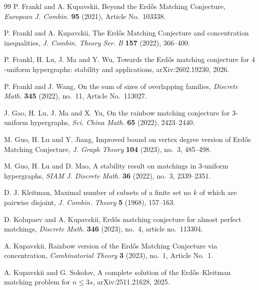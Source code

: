 \documentclass[10pt,a4paper]{article}
\numberwithin{equation}{section}
\theoremstyle{definition}
\begin{document}
\begin{thebibliography}{99}
        P. Frankl and A. Kupavskii,
        Beyond the Erd\H{o}s Matching Conjecture,
        \emph{European J. Combin.} \textbf{95} (2021), Article No.~103338.

        P. Frankl and A. Kupavskii,
        The Erd\H{o}s Matching Conjecture and concentration inequalities,
        \emph{J. Combin. Theory Ser. B} {\bf 157} (2022), 366--400.

        P. Frankl, H. Lu, J. Ma and Y. Wu,
        Towards the Erd\H{o}s matching conjecture for $4$-uniform hypergraphs:
        stability and applications,
        arXiv:2602.19230, 2026.

        P. Frankl and J. Wang,
        On the sum of sizes of overlapping families,
        \emph{Discrete Math.} \textbf{345} (2022), no.~11, Article No.~113027.

        J. Gao, H. Lu, J. Ma and X. Yu,
        On the rainbow matching conjecture for $3$-uniform hypergraphs,
        \emph{Sci. China Math.} \textbf{65} (2022), 2423--2440.

        M. Guo, H. Lu and Y. Jiang,
        Improved bound on vertex degree version of Erd\H{o}s Matching Conjecture,
        \emph{J. Graph Theory} \textbf{104} (2023), no.~3, 485--498.

        M. Guo, H. Lu and D. Mao,
        A stability result on matchings in $3$-uniform hypergraphs,
        \emph{SIAM J. Discrete Math.} \textbf{36} (2022), no.~3, 2339--2351.

        D. J. Kleitman,
        Maximal number of subsets of a finite set no $k$ of which are pairwise disjoint,
        \emph{J. Combin. Theory} \textbf{5} (1968), 157--163.

        D. Kolupaev and A. Kupavskii,
        Erd\H{o}s matching conjecture for almost perfect matchings,
        \emph{Discrete Math.} \textbf{346} (2023), no.~4, article no.~113304.

        A. Kupavskii,
        Rainbow version of the Erd\H{o}s Matching Conjecture via concentration,
        \emph{Combinatorial Theory} \textbf{3} (2023), no.~1, Article No.~1.

        A. Kupavskii and G. Sokolov,
        A complete solution of the Erd\H{o}s--Kleitman matching problem for $n\le3s$,
        arXiv:2511.21628, 2025.


\end{thebibliography}
\end{document}
